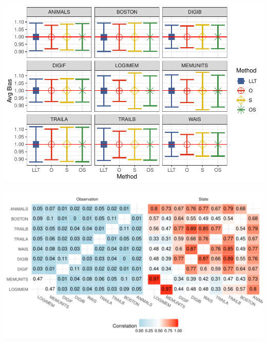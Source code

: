 \documentclass[
]{article}
\begin{document}
\includegraphics{RealDataSim_files/figure-latex/unnamed-chunk-3-1.pdf}

\includegraphics{RealDataSim_files/figure-latex/unnamed-chunk-4-1.pdf}
\end{document}
